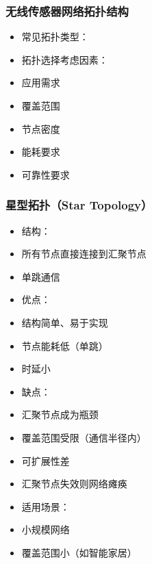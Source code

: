 \documentclass[aspectratio=43]{beamer}
\begin{document}
\begin{frame}
  \frametitle{无线传感器网络拓扑结构}

  \begin{itemize}
  \item<+-> 常见拓扑类型：
  \item<+-> 拓扑选择考虑因素：
  \item<+-> 应用需求
  \item<+-> 覆盖范围
  \item<+-> 节点密度
  \item<+-> 能耗要求
  \item<+-> 可靠性要求
  \end{itemize}
\end{frame}

\begin{frame}
  \frametitle{星型拓扑（Star Topology）}

  \begin{itemize}
  \item<+-> 结构：
  \item<+-> 所有节点直接连接到汇聚节点
  \item<+-> 单跳通信
  \item<+-> 优点：
  \item<+-> 结构简单、易于实现
  \item<+-> 节点能耗低（单跳）
  \item<+-> 时延小
  \item<+-> 缺点：
  \item<+-> 汇聚节点成为瓶颈
  \item<+-> 覆盖范围受限（通信半径内）
  \item<+-> 可扩展性差
  \item<+-> 汇聚节点失效则网络瘫痪
  \item<+-> 适用场景：
  \item<+-> 小规模网络
  \item<+-> 覆盖范围小（如智能家居）
  \end{itemize}
\end{frame}
\end{document}
